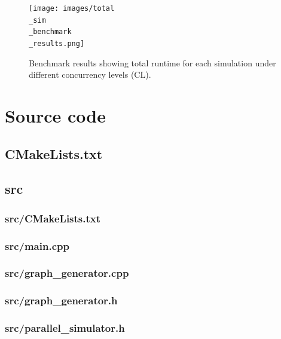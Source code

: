 \begin{figure}[H]
\centering
\texttt{[image: images/total\\\_sim\\\_benchmark\\\_results.png]}
\caption{Benchmark results showing total runtime for each simulation under different concurrency levels (CL).}
\label{fig:total_sim_benchmark_results}
\end{figure}



\newpage

\section{Source code}
\subsection{CMakeLists.txt}


\newpage
\subsection{src}
\subsubsection{src/CMakeLists.txt}

\newpage
\subsubsection{src/main.cpp}\label{subsection:main}

\newpage
\subsubsection{src/graph\_generator.cpp}\label{subsection:graph_generator}

\newpage
\subsubsection{src/graph\_generator.h}

\newpage
\subsubsection{src/parallel\_simulator.h}

\newpage
